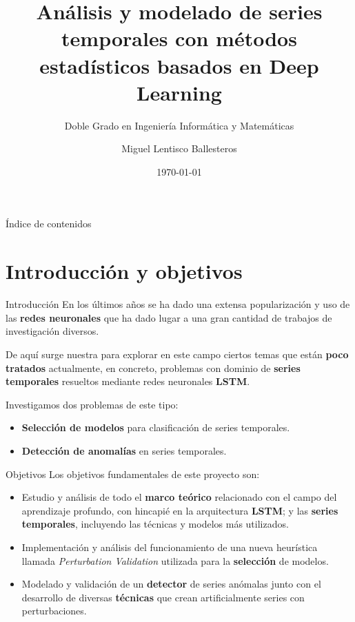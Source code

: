 \documentclass[spanish]{beamer}
\title{Análisis y modelado de series temporales con métodos estadísticos basados en Deep Learning}
\subtitle{Doble Grado en Ingeniería Informática y Matemáticas}
\date{\today}
\author{Miguel Lentisco Ballesteros}
\institute{Trabajo Fin de Grado \\\\\\ \textit{E.T.S de Ingenierías Informática y de Telecomunicación \\ Facultad de Ciencias}}
\begin{document}
\maketitle

\begin{frame}{Índice de contenidos}
  \tableofcontents
\end{frame}

\section{Introducción y objetivos}

\begin{frame}{Introducción}
  En los últimos años se ha dado una extensa popularización y uso de las \textbf{redes neuronales} que ha dado lugar a una gran cantidad de trabajos de investigación diversos.\pause

  De aquí surge nuestra para explorar en este campo ciertos temas que están \textbf{poco tratados} actualmente, en concreto, problemas con dominio de \textbf{series temporales} resueltos mediante redes neuronales \textbf{LSTM}.

  \pause

  Investigamos dos problemas de este tipo:
  \pause
  \begin{itemize}[<+->]
    \item \textbf{Selección de modelos} para clasificación de series temporales.
    \item \textbf{Detección de anomalías} en series temporales.
  \end{itemize}
\end{frame}

\begin{frame}{Objetivos}
  Los objetivos fundamentales de este proyecto son:
  \pause
  \begin{itemize}[<+->]
    \item Estudio y análisis de todo el \textbf{marco teórico} relacionado con el campo del aprendizaje profundo, con hincapié en la arquitectura \textbf{LSTM}; y las \textbf{series temporales}, incluyendo las técnicas y modelos más utilizados.
    \item Implementación y análisis del funcionamiento de una nueva heurística llamada \emph{Perturbation Validation} utilizada para la \textbf{selección} de modelos.
    \item Modelado y validación de un \textbf{detector} de series anómalas junto con el desarrollo de diversas \textbf{técnicas} que crean artificialmente series con perturbaciones.
  \end{itemize}
\end{frame}
\end{document}
